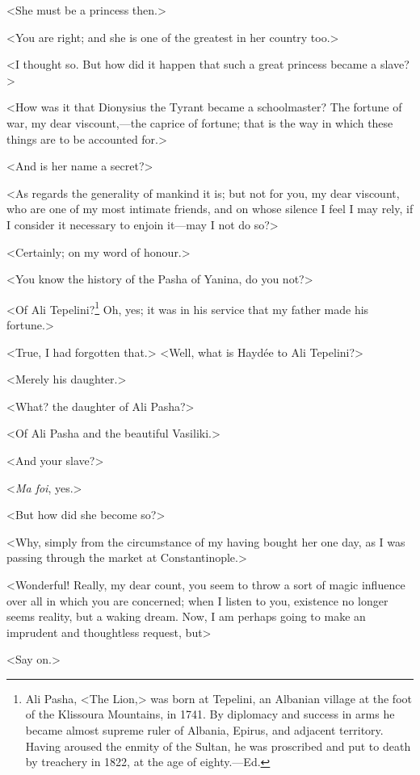  <She must be a princess then.> 

 <You are right; and she is one of the greatest in her country too.> 

 <I thought so. But how did it happen that such a great princess became a slave?> 

 <How was it that Dionysius the Tyrant became a schoolmaster? The fortune of war, my dear viscount,—the caprice of fortune; that is the way in which these things are to be accounted for.> 

 <And is her name a secret?> 

 <As regards the generality of mankind it is; but not for you, my dear viscount, who are one of my most intimate friends, and on whose silence I feel I may rely, if I consider it necessary to enjoin it—may I not do so?> 

 <Certainly; on my word of honour.> 

 <You know the history of the Pasha of Yanina, do you not?> 

 <Of Ali Tepelini?\footnote{Ali Pasha, <The Lion,> was born at Tepelini, an Albanian village at the foot of the Klissoura Mountains, in 1741. By diplomacy and success in arms he became almost supreme ruler of Albania, Epirus, and adjacent territory. Having aroused the enmity of the Sultan, he was proscribed and put to death by treachery in 1822, at the age of eighty.—Ed.} Oh, yes; it was in his service that my father made his fortune.> 

 <True, I had forgotten that.>  <Well, what is Haydée to Ali Tepelini?> 

 <Merely his daughter.> 

 <What? the daughter of Ali Pasha?> 

 <Of Ali Pasha and the beautiful Vasiliki.> 

 <And your slave?> 

 <\textit{Ma foi}, yes.> 

 <But how did she become so?> 

 <Why, simply from the circumstance of my having bought her one day, as I was passing through the market at Constantinople.> 

 <Wonderful! Really, my dear count, you seem to throw a sort of magic influence over all in which you are concerned; when I listen to you, existence no longer seems reality, but a waking dream. Now, I am perhaps going to make an imprudent and thoughtless request, but\longdash> 

 <Say on.> 

